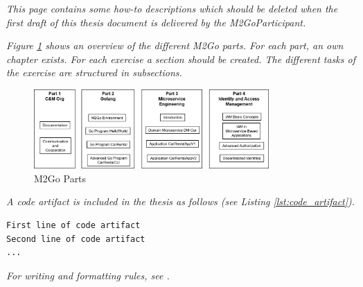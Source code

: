 \textit{This page contains some how-to descriptions which should be deleted when the first draft of this thesis document is delivered by the M2GoParticipant.}

\textit{Figure \ref{fig:m2go_parts} shows an overview of the different M2Go parts. For each part, an own chapter exists. For each exercise a section should be created. The different tasks of the exercise are structured in subsections.}

%
\begin{figure}[H]
	\centering
	\includegraphics[width=0.8\textwidth]{figures/m2go_parts.png}
	\caption{M2Go Parts}
	\label{fig:m2go_parts}
\end{figure}
%


\textit{A code artifact is included in the thesis as follows (see Listing \ref{lst:code_artifact}).}

\begin{lstlisting}[caption = {Example for Code Artifacts in the Thesis}, label = {lst:code_artifact}, style = kit-cm]
First line of code artifact
Second line of code artifact
...
\end{lstlisting}

\textit{For writing and formatting rules, see \cite{CM-T-CMW}.}